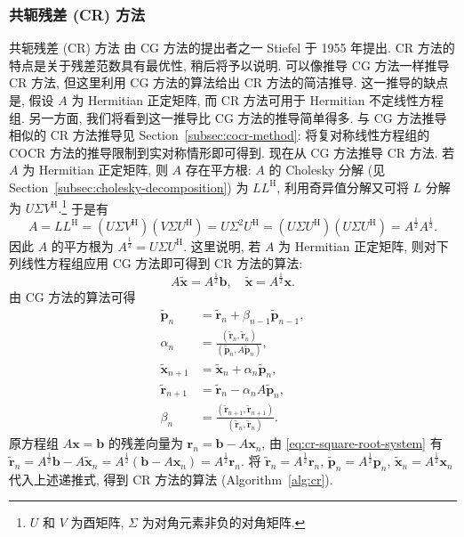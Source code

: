 \subsubsection{{共轭残差 (CR) 方法}}\label{subsec:conjugate-residual}
{共轭残差 (CR) 方法  由 CG 方法的提出者之一 Stiefel 于 1955 年提出. CR 方法的特点是关于残差范数具有最优性, 稍后将予以说明.}
{可以像推导 CG 方法一样推导 CR 方法, 但这里利用 CG 方法的算法给出 CR 方法的简洁推导. 这一推导的缺点是, 假设 $A$ 为 Hermitian 正定矩阵, 而 CR 方法可用于 Hermitian 不定线性方程组. 另一方面, 我们将看到这一推导比 CG 方法的推导简单得多. 与 CG 方法推导相似的 CR 方法推导见 Section\ \ref{subsec:cocr-method}: 将复对称线性方程组的 COCR 方法的推导限制到实对称情形即可得到.}
{现在从 CG 方法推导 CR 方法. 若 $A$ 为 Hermitian 正定矩阵, 则 $A$ 存在平方根: $A$ 的 Cholesky 分解 (见 Section\ \ref{subsec:cholesky-decomposition}) 为 $LL^{\mathrm H}$, 利用奇异值分解又可将 $L$ 分解为 $U\Sigma V^{\mathrm H}$.}\footnote{{$U$ 和 $V$ 为酉矩阵, $\Sigma$ 为对角元素非负的对角矩阵.}}
{于是有}
\[A=LL^{\mathrm H}=(U\Sigma V^{\mathrm H})(V\Sigma U^{\mathrm H})=U\Sigma^2U^{\mathrm H}=(U\Sigma U^{\mathrm H})(U\Sigma U^{\mathrm H})=A^{\frac12}A^{\frac12}.\]
{因此 $A$ 的平方根为 $A^{\frac12}=U\Sigma U^{\mathrm H}$. 这里说明, 若 $A$ 为 Hermitian 正定矩阵, 则对下列线性方程组应用 CG 方法即可得到 CR 方法的算法:}
\begin{equation}\label{eq:cr-square-root-system}A\widetilde{\bm x}=A^{\frac12}\bm b,\quad\widetilde{\bm x}=A^{\frac12}\bm x.\end{equation}
{由 CG 方法的算法可得}
\[\begin{aligned}
\widetilde{\bm p}_n&=\widetilde{\bm r}_n+\beta_{n-1}\widetilde{\bm p}_{n-1},\\
\alpha_n&=\frac{(\widetilde{\bm r}_n,\widetilde{\bm r}_n)}{(\widetilde{\bm p}_n,A\widetilde{\bm p}_n)},\\
\widetilde{\bm x}_{n+1}&=\widetilde{\bm x}_n+\alpha_n\widetilde{\bm p}_n,\\
\widetilde{\bm r}_{n+1}&=\widetilde{\bm r}_n-\alpha_nA\widetilde{\bm p}_n,\\
\beta_n&=\frac{(\widetilde{\bm r}_{n+1},\widetilde{\bm r}_{n+1})}{(\widetilde{\bm r}_n,\widetilde{\bm r}_n)}.
\end{aligned}\]
{原方程组 $A\bm x=\bm b$ 的残差向量为 $\bm r_n=\bm b-A\bm x_n$, 由 \eqref{eq:cr-square-root-system} 有 $\widetilde{\bm r}_n=A^{\frac12}\bm b-A\widetilde{\bm x}_n=A^{\frac12}(\bm b-A\bm x_n)=A^{\frac12}\bm r_n$. 将 $\widetilde{\bm r}_n=A^{\frac12}\bm r_n$, $\widetilde{\bm p}_n=A^{\frac12}\bm p_n$, $\widetilde{\bm x}_n=A^{\frac12}\bm x_n$ 代入上述递推式, 得到 CR 方法的算法 (Algorithm\ \ref{alg:cr}).}
